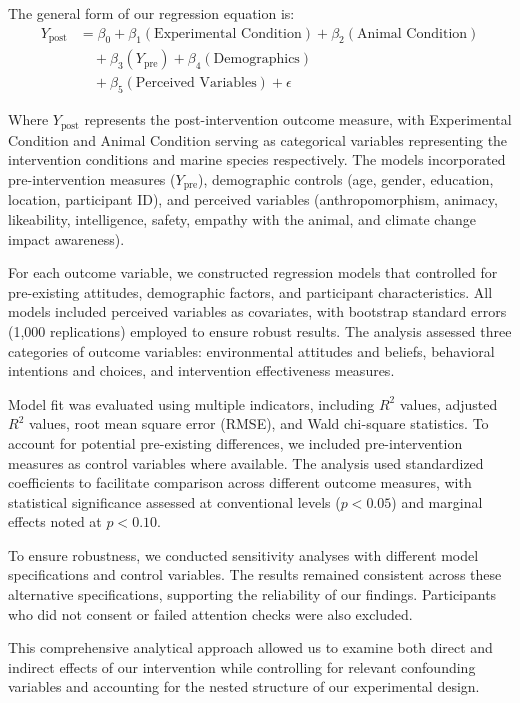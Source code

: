 \documentclass[sigconf, nonacm]{acmart}
\begin{document}
The general form of our regression equation is:
\begin{align*}
Y_{\text{post}} &= \beta_0 + \beta_1(\text{Experimental Condition}) + \beta_2(\text{Animal Condition}) \\
                &\quad + \beta_3(Y_{\text{pre}}) + \beta_4(\text{Demographics}) \\
                &\quad + \beta_5(\text{Perceived Variables}) + \epsilon
\end{align*}

Where $Y_{\text{post}}$ represents the post-intervention outcome measure, with Experimental Condition and Animal Condition serving as categorical variables representing the intervention conditions and marine species respectively. The models incorporated pre-intervention measures ($Y_{\text{pre}}$), demographic controls (age, gender, education, location, participant ID), and perceived variables (anthropomorphism, animacy, likeability, intelligence, safety, empathy with the animal, and climate change impact awareness).

For each outcome variable, we constructed regression models that controlled for pre-existing attitudes, demographic factors, and participant characteristics. All models included perceived variables as covariates, with bootstrap standard errors (1,000 replications) employed to ensure robust results. The analysis assessed three categories of outcome variables: environmental attitudes and beliefs, behavioral intentions and choices, and intervention effectiveness measures.

Model fit was evaluated using multiple indicators, including $R^2$ values, adjusted $R^2$ values, root mean square error (RMSE), and Wald chi-square statistics. To account for potential pre-existing differences, we included pre-intervention measures as control variables where available. The analysis used standardized coefficients to facilitate comparison across different outcome measures, with statistical significance assessed at conventional levels ($p < 0.05$) and marginal effects noted at $p < 0.10$.

To ensure robustness, we conducted sensitivity analyses with different model specifications and control variables. The results remained consistent across these alternative specifications, supporting the reliability of our findings. Participants who did not consent or failed attention checks were also excluded.

This comprehensive analytical approach allowed us to examine both direct and indirect effects of our intervention while controlling for relevant confounding variables and accounting for the nested structure of our experimental design.
\end{document}
